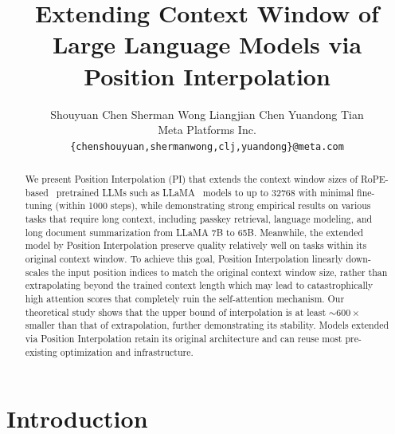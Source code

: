 \documentclass{article} %
\title{Extending Context Window of Large Language Models via Position Interpolation}
\author{Shouyuan Chen \hspace{1em} Sherman Wong \hspace{1em} Liangjian Chen \hspace{1em} Yuandong Tian \\
Meta Platforms Inc. \\
\texttt{\{chenshouyuan,shermanwong,clj,yuandong\}@meta.com} 
}
\theoremstyle{definition}
\newcommand{\yuandong}[1]{\textcolor{red}{[Yuandong: #1]}}
\newcommand{\clj}[1]{\textcolor{blue}{[clj: #1]}}
\newcommand{\ignore}[1]{}
\begin{document}
\maketitle

\begin{abstract}
We present Position Interpolation (PI) that extends 
the context window sizes of RoPE-based~\citep{su2021roformer} pretrained LLMs such as LLaMA~\citep{touvron2023llama} models to up to 32768 with minimal fine-tuning (within 1000 steps), while demonstrating strong empirical results on various tasks that require long context, including passkey retrieval, language modeling, and long document summarization from LLaMA 7B to 65B. Meanwhile, the extended model by Position Interpolation preserve quality relatively well on tasks within its original context window. To achieve this goal, Position Interpolation linearly down-scales the input position indices to match the original context window size, rather than extrapolating beyond the trained context length which may lead to catastrophically high attention scores that completely ruin the self-attention mechanism. Our theoretical study shows that the upper bound of interpolation is at least $\sim 600 \times$ smaller than that of extrapolation, further demonstrating its stability. Models extended via Position Interpolation retain its original architecture
and can reuse most pre-existing optimization and infrastructure.
\end{abstract}


\section{Introduction}
\ignore{ %
\clj{In recent years, large language models (LLMs) have surpassed expectations, with notable examples like Chat-GPT, GPT-4 from OpenAI, and LLaMA from Meta. These models have demonstrated impressive capabilities in neutral language processing tasks. A key factor contributing to their success is the incorporation of long context windows, enabling the models to grasp contextual information effectively.
The inclusion of long context windows empowers LLMs to excel in long-form generation tasks. This capability unlocks a wide range of practical applications, such as incorporating extended conversational context, writing or continuing novels, summarizing financial or legal reports, and providing detailed answers to important questions.}   \yuandong{We should start from why long-form language model tasks are important and list a few existing models}. 
}
\end{document}
